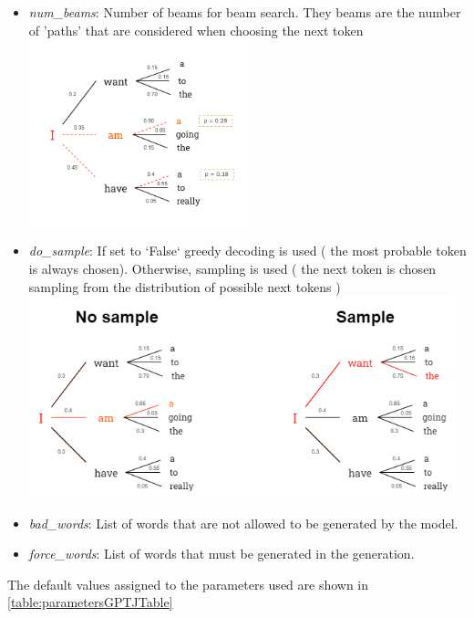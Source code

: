 \begin{itemize}
    \item \textit{num\_beams}: Number of beams for beam search. They beams are the number of 'paths' that are considered when choosing the next token \\
    \includegraphics[width=0.5\textwidth]{images/num_beams.drawio.png}

    \item \textit{do\_sample}: If set to `False` greedy decoding is used ( the most probable token is always chosen). Otherwise, sampling is used ( the next token is chosen sampling from the distribution of possible next tokens )
    \includegraphics[width=0.98\textwidth]{images/do_sample.drawio.png}

    \item \textit{bad\_words}: List of words that are not allowed to be generated by the model.
    \item \textit{force\_words}: List of words that must be generated in the generation.
    
\end{itemize}
The default values assigned to the parameters used are shown in \autoref{table:parametersGPTJTable}
